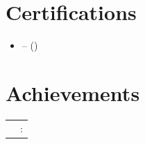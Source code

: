\documentclass[10pt, a4paper]{article}
\newcommand{\hskills}[1]{{\bfseries #1} }
\begin{document}

\section{Certifications}
\begin{itemize}[itemsep=0pt, parsep=1pt, leftmargin=1em]

  \item  --  ()

\end{itemize}
\vspace{-0.2cm}



\section{Achievements} %
\begin{tabularx}{\textwidth}{@{} p{4em} X @{}}

\hskills{} & :  \\

\end{tabularx}
\vspace{-0.2cm}

\end{document}
